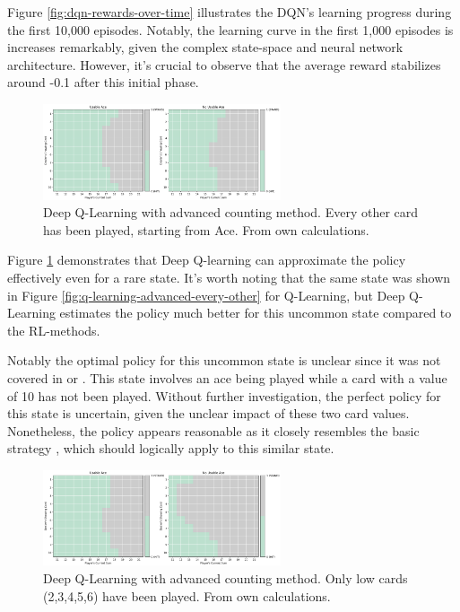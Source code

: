\documentclass[conference]{IEEEtran}
\begin{document}
Figure \ref{fig:dqn-rewards-over-time} illustrates the DQN's learning progress during the first 10,000 episodes. Notably, the learning curve in the first 1,000 episodes is increases remarkably, given the complex state-space and neural network architecture. However, it's crucial to observe that the average reward stabilizes around -0.1 after this initial phase.

\begin{figure}
	\centering
	\includegraphics[width=70mm]{figures/DQN/advanced/policy-1010101010.png}
	\caption{Deep Q-Learning with advanced counting method. Every other card has been played, starting from Ace. From own calculations.}
	\label{fig:dqn-advanced-every-other}
\end{figure}

Figure \ref{fig:dqn-advanced-every-other} demonstrates that Deep Q-learning can approximate the policy effectively even for a rare state. It's worth noting that the same state was shown in Figure \ref{fig:q-learning-advanced-every-other} for Q-Learning, but Deep Q-Learning estimates the policy much better for this uncommon state compared to the RL-methods.

Notably the optimal policy for this uncommon state is unclear since it was not covered in \cite{b1} or \cite{b4}. This state involves an ace being played while a card with a value of 10 has not been played. Without further investigation, the perfect policy for this state is uncertain, given the unclear impact of these two card values. Nonetheless, the policy appears reasonable as it closely resembles the basic strategy \cite{b1}, which should logically apply to this similar state.

\begin{figure}
	\centering
	\includegraphics[width=70mm]{figures/DQN/advanced/policy-low-cards-played.png}
	\caption{Deep Q-Learning with advanced counting method. Only low cards (2,3,4,5,6) have been played. From own calculations.}
	\label{fig:dqn-advanced-only-low}
\end{figure}
\end{document}
